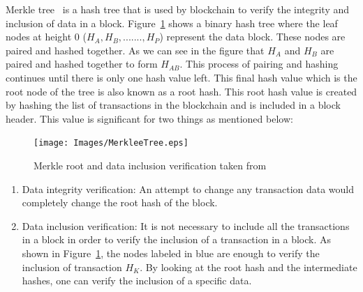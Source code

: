 Merkle tree~\cite{becker2008merkle} is a hash tree that is used by blockchain
to verify the integrity and inclusion of data in a block.
Figure~\ref{fig:merkleTree} shows a binary hash tree where the leaf nodes at
height 0 ($H_{A}, H_{B}, ......., H_{P}$) represent the data block. These nodes
are paired and hashed together. As we can see in the figure that $H_A$ and
$H_{B}$ are paired and hashed together to form $H_{AB}$. This process of
pairing and hashing continues until there is only one hash value left. This
final hash value which is the root node of the tree is also known as a root
hash.  This root hash value is created by hashing the list of transactions in
the blockchain and is included in a block header. 
This value is significant for two things as mentioned
below:  
\begin{figure}
	\begin{center}
		\texttt{[image: Images/MerkleeTree.eps]}
		\caption{Merkle root and data inclusion verification taken from~\cite{merklepath}}
		\label{fig:merkleTree}
	\end{center}
\end{figure}
\begin{enumerate}
	\item Data integrity verification: An attempt to change any transaction data
		would completely change the root hash of the block.  
	\item Data inclusion verification: It is not necessary to include all the
		transactions in a block in order to verify the inclusion of a
		transaction in a block. As shown in Figure~\ref{fig:merkleTree}, the
		nodes labeled in blue are enough to verify the inclusion of transaction
		$H_{K}$. By looking at the root hash and the intermediate hashes, one
		can verify the inclusion of a specific data.
\end{enumerate}
